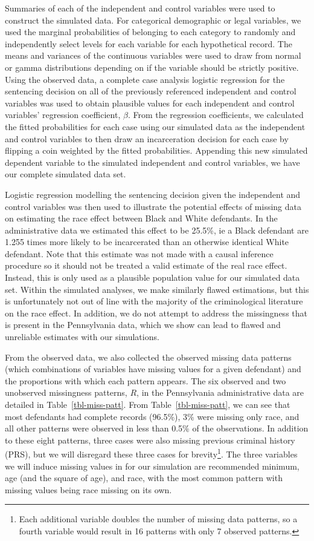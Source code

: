 \documentclass[
  letterpaper,
  DIV=11,
  numbers=noendperiod]{scrartcl}
\begin{document}
Summaries of each of the independent and control variables were used to
construct the simulated data. For categorical demographic or legal
variables, we used the marginal probabilities of belonging to each
category to randomly and independently select levels for each variable
for each hypothetical record. The means and variances of the continuous
variables were used to draw from normal or gamma distributions depending
on if the variable should be strictly positive. Using the observed data,
a complete case analysis logistic regression for the sentencing decision
on all of the previously referenced independent and control variables
was used to obtain plausible values for each independent and control
variables' regression coefficient, \(\beta\). From the regression
coefficients, we calculated the fitted probabilities for each case using
our simulated data as the independent and control variables to then draw
an incarceration decision for each case by flipping a coin weighted by
the fitted probabilities. Appending this new simulated dependent
variable to the simulated independent and control variables, we have our
complete simulated data set.

Logistic regression modelling the sentencing decision given the
independent and control variables was then used to illustrate the
potential effects of missing data on estimating the race effect between
Black and White defendants. In the administrative data we estimated this
effect to be 25.5\%, ie a Black defendant are 1.255 times more likely to
be incarcerated than an otherwise identical White defendant. Note that
this estimate was not made with a causal inference procedure so it
should not be treated a valid estimate of the real race effect. Instead,
this is only used as a plausible population value for our simulated data
set. Within the simulated analyses, we make similarly flawed
estimations, but this is unfortunately not out of line with the majority
of the criminological literature on the race effect. In addition, we do
not attempt to address the missingness that is present in the
Pennsylvania data, which we show can lead to flawed and unreliable
estimates with our simulations.

From the observed data, we also collected the observed missing data
patterns (which combinations of variables have missing values for a
given defendant) and the proportions with which each pattern appears.
The six observed and two unobserved missingness patterns, \(R\), in the
Pennsylvania administrative data are detailed in
Table~\ref{tbl-miss-patt}. From Table~\ref{tbl-miss-patt}, we can see
that most defendants had complete records (96.5\%), 3\% were missing
only race, and all other patterns were observed in less than 0.5\% of
the observations. In addition to these eight patterns, three cases were
also missing previous criminal history (PRS), but we will disregard
these three cases for brevity\footnote{Each additional variable doubles
  the number of missing data patterns, so a fourth variable would result
  in 16 patterns with only 7 observed patterns.}. The three variables we
will induce missing values in for our simulation are recommended
minimum, age (and the square of age), and race, with the most common
pattern with missing values being race missing on its own.
\end{document}
